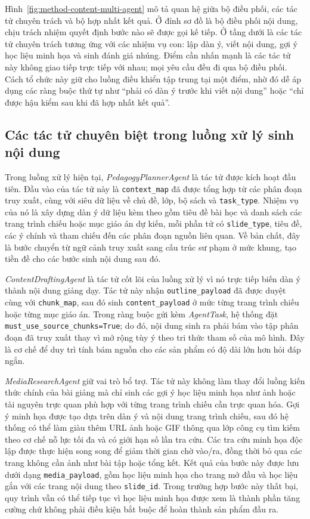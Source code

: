 \documentclass[../DoAn.tex]{subfiles}
\begin{document}
Hình~\ref{fig:method-content-multi-agent} mô tả quan hệ giữa bộ điều phối, các tác tử chuyên trách và bộ hợp nhất kết quả. Ở đỉnh sơ đồ là bộ điều phối nội dung, chịu trách nhiệm quyết định bước nào sẽ được gọi kế tiếp. Ở tầng dưới là các tác tử chuyên trách tương ứng với các nhiệm vụ con: lập dàn ý, viết nội dung, gợi ý học liệu minh họa và sinh đánh giá nhúng. Điểm cần nhấn mạnh là các tác tử này không giao tiếp trực tiếp với nhau; mọi yêu cầu đều đi qua bộ điều phối. Cách tổ chức này giữ cho luồng điều khiển tập trung tại một điểm, nhờ đó dễ áp dụng các ràng buộc thứ tự như ``phải có dàn ý trước khi viết nội dung'' hoặc ``chỉ được hậu kiểm sau khi đã hợp nhất kết quả''.

\subsection{Các tác tử chuyên biệt trong luồng xử lý sinh nội dung}

Trong luồng xử lý hiện tại, \textit{PedagogyPlannerAgent} là tác tử được kích hoạt đầu tiên. Đầu vào của tác tử này là \texttt{context\_map} đã được tổng hợp từ các phân đoạn truy xuất, cùng với siêu dữ liệu về chủ đề, lớp, bộ sách và \texttt{task\_type}. Nhiệm vụ của nó là xây dựng dàn ý dữ liệu kèm theo gồm tiêu đề bài học và danh sách các trang trình chiếu hoặc mục giáo án dự kiến, mỗi phần tử có \texttt{slide\_type}, tiêu đề, các ý chính và tham chiếu đến các phân đoạn nguồn liên quan. Về bản chất, đây là bước chuyển từ ngữ cảnh truy xuất sang cấu trúc sư phạm ở mức khung, tạo tiền đề cho các bước sinh nội dung sau đó.

\textit{ContentDraftingAgent} là tác tử cốt lõi của luồng xử lý vì nó trực tiếp biến dàn ý thành nội dung giảng dạy. Tác tử này nhận \texttt{outline\_payload} đã được duyệt cùng với \texttt{chunk\_map}, sau đó sinh \texttt{content\_payload} ở mức từng trang trình chiếu hoặc từng mục giáo án. Trong ràng buộc gửi kèm \textit{AgentTask}, hệ thống đặt \texttt{must\_use\_source\_chunks=True}; do đó, nội dung sinh ra phải bám vào tập phân đoạn đã truy xuất thay vì mở rộng tùy ý theo tri thức tham số của mô hình. Đây là cơ chế để duy trì tính bám nguồn cho các sản phẩm có độ dài lớn hơn hỏi đáp ngắn.

\textit{MediaResearchAgent} giữ vai trò bổ trợ. Tác tử này không làm thay đổi luồng kiến thức chính của bài giảng mà chỉ sinh các gợi ý học liệu minh họa như ảnh hoặc tài nguyên trực quan phù hợp với từng trang trình chiếu cần trực quan hóa. Gợi ý minh họa được tạo dựa trên dàn ý và nội dung trang trình chiếu, sau đó hệ thống có thể làm giàu thêm URL ảnh hoặc GIF thông qua lớp công cụ tìm kiếm theo cơ chế nỗ lực tối đa và có giới hạn số lần tra cứu. Các tra cứu minh họa độc lập được thực hiện song song để giảm thời gian chờ vào/ra, đồng thời bỏ qua các trang không cần ảnh như bài tập hoặc tổng kết. Kết quả của bước này được lưu dưới dạng \texttt{media\_payload}, gồm học liệu minh họa cho trang mở đầu và học liệu gắn với các trang nội dung theo \texttt{slide\_id}. Trong trường hợp bước này thất bại, quy trình vẫn có thể tiếp tục vì học liệu minh họa được xem là thành phần tăng cường chứ không phải điều kiện bắt buộc để hoàn thành sản phẩm đầu ra.
\end{document}
